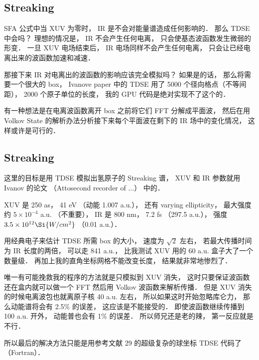 \subsection{Streaking}
SFA 公式中当 XUV 为零时， IR 是不会对能量谱造成任何影响的． 那么 TDSE 中会吗？ 理想的情况是， IR 不会产生任何电离， 只会使基态波函数发生微弱的形变． 一旦 XUV 电场结束后， IR 电场同样不会产生任何电离， 只会让已经电离出来的波函数加速和减速．

那接下来 IR 对电离出的波函数的影响应该完全模拟吗？ 如果是的话， 那么将需要一个很大的 box， Ivanove paper 中的 TDSE 用了 5000 个径向格点（不等间距）， 2000 个原子单位的长度， 我的 GPU 代码是绝对实现不了这个的．

有一种想法是在电离波函数离开 box 之前将它们 FFT 分解成平面波， 然后在用 Volkov State 的解析办法分析接下来每个平面波在剩下的 IR 场中的变化情况， 这样或许是可行的．


\subsection{Streaking}
这里的目标是用 TDSE 模拟出氢原子的 Streaking 谱， XUV 和 IR 参数就用 Ivanov 的论文 （Attosecond recorder of ...） 中的．

XUV 是 250 as， 41 eV （动能 1.007 a.u.）， 还有 varying ellipticity， 最大强度约 $5\times 10^{-4}$ a.u. （不重要）， IR 是 800 nm， 7.2 fs （297.5 a.u.）， 强度 $3.5\times 10^{12} \Si{W/cm^2}$ （0.01 a.u.）．

用经典电子来估计 TDSE 所需 box 的大小， 速度为 $\sqrt{2}$ 左右， 若最大传播时间为 IR 长度的两倍， 可以走 841 a.u.， 比我测试 XUV 用的 60 a.u. 盒子大了一个数量级． 再加上我的直角坐标网格不能改变长度， 结果就非常地惨烈了．

唯一有可能挽救我的程序的方法就是只模拟到 XUV 消失， 这时只要保证波函数还在盒内就可以做一个 FFT 然后用 Volkov 波函数来解析传播． 但是 XUV 消失的时候电离波包也就离原子核 40 a.u. 左右， 所以如果这时开始忽略库仑力， 那么动能谱将会有 2.5\% 的误差， 这应该是不能接受的． 即使波函数继续传播到 100 a.u. 开外， 动能普也会有 1\% 的误差． 所以师兄还是老的辣， 第一反应就是不行．

所以最后的解决方法只能是用参考文献 29 的超级复杂的球坐标 TDSE 代码了（Fortran）．
